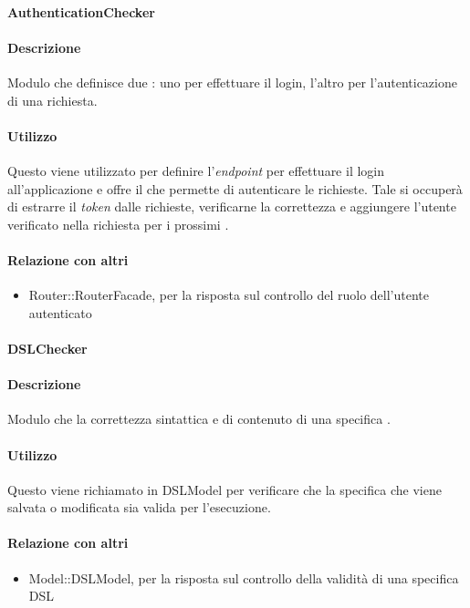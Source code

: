 \paragraph{AuthenticationChecker}
\paragraph*{Descrizione}
Modulo che definisce due : uno per effettuare il login, l'altro per l'autenticazione di una richiesta.

\paragraph*{Utilizzo}
Questo  viene utilizzato per definire l'\textit{endpoint} per effettuare il login all'applicazione e offre il  che permette di autenticare le richieste. Tale  si occuperà di estrarre il \textit{token} dalle richieste, verificarne la correttezza e aggiungere l'utente verificato nella richiesta per i prossimi .

\paragraph*{Relazione con altri }
\begin{itemize}
\item Router::RouterFacade, per la risposta sul controllo del ruolo dell'utente autenticato
\end{itemize}

\paragraph{DSLChecker}
\paragraph*{Descrizione}
Modulo che  la correttezza sintattica e di contenuto di una specifica .

\paragraph*{Utilizzo}
Questo  viene richiamato in DSLModel per verificare che la specifica  che viene salvata o modificata sia valida per l'esecuzione.

\paragraph*{Relazione con altri }
\begin{itemize}
\item Model::DSLModel, per la risposta sul controllo della validità di una specifica DSL
\end{itemize}

